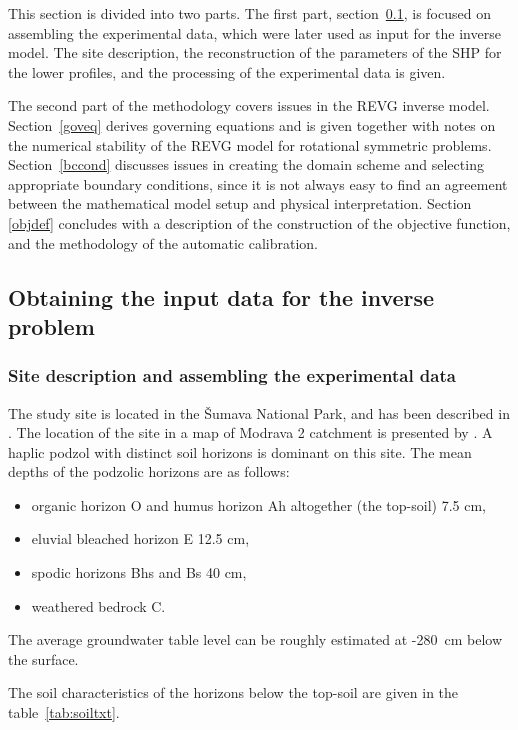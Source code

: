 \documentclass[review,times,3p,twocolumn,10pt]{elsarticle}
\begin{document}
This section is divided into two parts. The first part, section~\ref{assamb}, is focused on assembling the experimental data, which were later used as input for the inverse model. The site description, the reconstruction of the parameters of the SHP for the lower profiles, and the processing of the experimental data is given.   

The second part of the methodology covers issues in the REVG inverse model. Section~\ref{goveq} derives governing equations and is given together with notes on the numerical stability of the REVG model for rotational symmetric problems.
Section~\ref{bccond} discusses issues in creating the domain scheme and selecting appropriate boundary conditions, since it is not always easy to find an agreement between the mathematical model setup and  physical interpretation. Section \ref{objdef} concludes with a description of the construction of the objective function, and the methodology of the automatic calibration. 



\subsection{Obtaining the input data for the inverse problem}
\label{assamb}


\subsubsection{Site description and assembling the experimental data}%
\label{site}
The study site is located in the \v{S}umava National Park, and has been described in \citep{Jacka1}. The location of the site in a map of Modrava 2 catchment is presented by \cite{Jacka2}.
A haplic podzol with distinct soil horizons is dominant on this site. The mean depths of the podzolic horizons are as follows:
\begin{itemize}
\item organic horizon O and humus horizon Ah altogether (the top-soil) 7.5 cm, 
\item eluvial bleached horizon E 12.5 cm, 
\item spodic horizons Bhs and Bs 40 cm,
\item weathered bedrock C.
\end{itemize}
The average groundwater table level can be roughly estimated at -280~cm below the surface. 

The soil characteristics of the horizons below the top-soil %
are given in the table~\ref{tab:soiltxt}.
\end{document}
